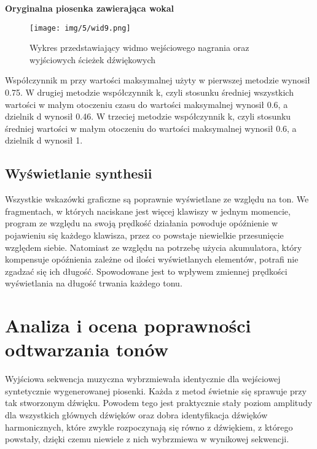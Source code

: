 \textbf{Oryginalna piosenka zawierająca wokal}


\begin{figure}[h]
  \centering
  \texttt{[image: img/5/wid9.png]}
  \caption{Wykres przedstawiający widmo wejściowego nagrania oraz \\wyjściowych ścieżek dźwiękowych}
\end{figure}

\noindent Współczynnik m przy wartości maksymalnej użyty w pierwszej metodzie wynosił 0.75.
W drugiej metodzie współczynnik k, czyli stosunku średniej wszystkich wartości w małym otoczeniu czasu do wartości maksymalnej wynosił 0.6, a dzielnik d wynosił 0.46.
W trzeciej metodzie współczynnik k, czyli stosunku średniej wartości w małym otoczeniu do wartości maksymalnej wynosił 0.6, a dzielnik d wynosił 1.

\subsection{Wyświetlanie synthesii}

Wszystkie wskazówki graficzne są poprawnie wyświetlane ze względu na ton. We fragmentach, w których naciskane jest więcej klawiszy w jednym momencie, program ze względu na swoją prędkość działania powoduje opóźnienie w pojawieniu się każdego klawisza, przez co powstaje niewielkie przesunięcie względem siebie. Natomiast ze względu na potrzebę użycia akumulatora, który kompensuje opóźnienia zależne od ilości wyświetlanych elementów, potrafi nie zgadzać się ich długość. Spowodowane jest to wpływem zmiennej prędkości wyświetlania na długość trwania każdego tonu.

\section{Analiza i ocena poprawności odtwarzania tonów}

Wyjściowa sekwencja muzyczna wybrzmiewała identycznie dla wejściowej syntetycznie wygenerowanej piosenki. Każda z metod świetnie się sprawuje przy tak stworzonym dźwięku. Powodem tego jest praktycznie stały poziom amplitudy dla wszystkich głównych dźwięków oraz dobra identyfikacja dźwięków harmonicznych, które zwykle rozpoczynają się równo z dźwiękiem, z którego powstały, dzięki czemu niewiele z nich wybrzmiewa w wynikowej sekwencji.

